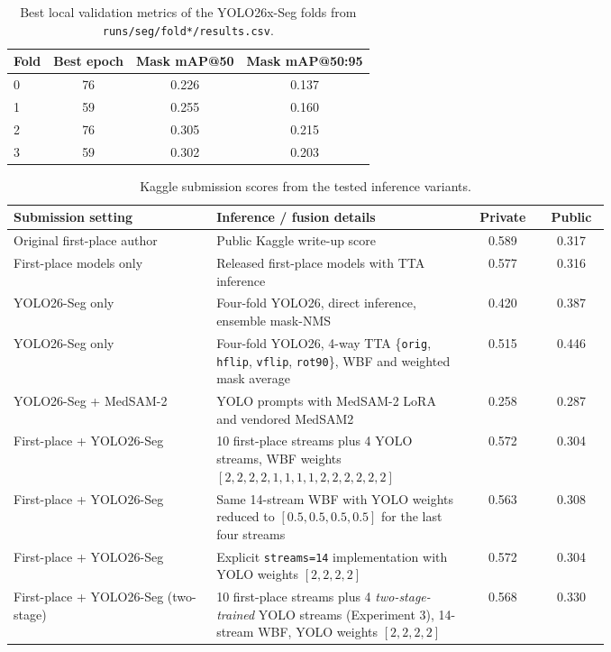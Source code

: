 \documentclass[12pt, a4paper]{article}
\begin{document}
\begin{table}[H]
    \centering
    \small
    \begin{tabular}{lccc}
        \toprule
        Fold & Best epoch & Mask mAP@50 & Mask mAP@50:95 \\
        \midrule
        0 & 76 & 0.226 & 0.137 \\
        1 & 59 & 0.255 & 0.160 \\
        2 & 76 & 0.305 & 0.215 \\
        3 & 59 & 0.302 & 0.203 \\
        \bottomrule
    \end{tabular}
    \caption{Best local validation metrics of the YOLO26x-Seg folds from \texttt{runs/seg/fold*/results.csv}.}
    \label{tab:yolo_folds}
\end{table}

\begin{table}[H]
    \centering
    \scriptsize
    \begin{adjustbox}{width=\linewidth}
    \begin{tabular}{p{0.34\linewidth}p{0.43\linewidth}cc}
        \toprule
        Submission setting & Inference / fusion details & Private & Public \\
        \midrule
        Original first-place author & Public Kaggle write-up score & 0.589 & 0.317 \\
        First-place models only & Released first-place models with TTA inference & 0.577 & 0.316 \\
        YOLO26-Seg only & Four-fold YOLO26, direct inference, ensemble mask-NMS & 0.420 & 0.387 \\
        YOLO26-Seg only & Four-fold YOLO26, 4-way TTA \{\texttt{orig}, \texttt{hflip}, \texttt{vflip}, \texttt{rot90}\}, WBF and weighted mask average & 0.515 & 0.446 \\
        YOLO26-Seg + MedSAM-2 & YOLO prompts with MedSAM-2 LoRA and vendored MedSAM2 & 0.258 & 0.287 \\
        First-place + YOLO26-Seg & 10 first-place streams plus 4 YOLO streams, WBF weights \([2,2,2,2,1,1,1,1,2,2,2,2,2,2]\) & 0.572 & 0.304 \\
        First-place + YOLO26-Seg & Same 14-stream WBF with YOLO weights reduced to \([0.5,0.5,0.5,0.5]\) for the last four streams & 0.563 & 0.308 \\
        First-place + YOLO26-Seg & Explicit \texttt{streams=14} implementation with YOLO weights \([2,2,2,2]\) & 0.572 & 0.304 \\
        First-place + YOLO26-Seg (two-stage) & 10 first-place streams plus 4 \emph{two-stage-trained} YOLO streams (Experiment 3), 14-stream WBF, YOLO weights \([2,2,2,2]\) & 0.568 & 0.330 \\
        \bottomrule
    \end{tabular}
    \end{adjustbox}
    \caption{Kaggle submission scores from the tested inference variants.}
    \label{tab:kaggle_submissions}
\end{table}
\end{document}

